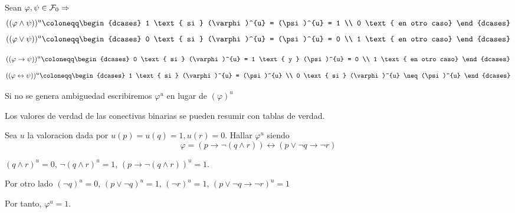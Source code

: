 \begin{definition}
	Sean \(\varphi, \psi \in \mathcal{\MakeUppercase{f}}_0  \Rightarrow\)
	\[
		((\varphi \wedge \psi))^{u} \coloneqq \begin{dcases}
			1 \text{ si } (\varphi)^{u} = (\psi)^{u} = 1 \\
			0 \text{ en otro caso}
		\end{dcases}
	\]
	\[
		((\varphi \vee \psi))^{u} \coloneqq \begin{dcases}
			0 \text{ si } (\varphi)^{u} = (\psi)^{u} = 0 \\
			1 \text{ en otro caso}
		\end{dcases}
	\]

	\[
		((\varphi \rightarrow \psi))^{u} \coloneqq \begin{dcases}
			0 \text{ si } (\varphi)^{u} = 1 \text{ y } (\psi)^{u} = 0 \\
			1 \text{ en otro caso}
		\end{dcases}
	\]
	\[
		((\varphi \leftrightarrow \psi))^{u} \coloneqq \begin{dcases}
			1 \text{ si } (\varphi)^{u} = (\psi)^{u} \\
			0 \text{ si } (\varphi)^{u} \neq  (\psi)^{u}
		\end{dcases}
	\]

\end{definition}
\begin{remark}
	Si no se genera ambiguedad escribiremos \(\varphi^{u} \) en lugar de \((\varphi)^{u} \)
\end{remark}

\begin{remark}
	Los valores de verdad de las conectivas binarias se pueden resumir con tablas de verdad.
\end{remark}

\begin{example}
	Sea \(u \) la valoracion dada por \(u(p) = u(q) = 1, u(r) = 0 \). Hallar \(\varphi^{u} \) siendo
	\[
		\varphi = (p \rightarrow \neg(q \wedge r)) \leftrightarrow (p \vee \neg q \rightarrow \neg r )
	\]

	\((q \wedge r)^{u} = 0 \), \(\neg ( q \wedge r )^{u} = 1 \), \((p \rightarrow \neg (q \wedge  r))^{u} = 1 \).

	Por otro lado \((\neg q)^{u} = 0 \), \((p \vee \neg q )^{u} = 1 \), \((\neg r)^{u} = 1 	 \), \((p \vee \neg q \rightarrow \neg r)^{u} = 1  \)

	Por tanto, \(\varphi^{u} = 1 \).
\end{example}

